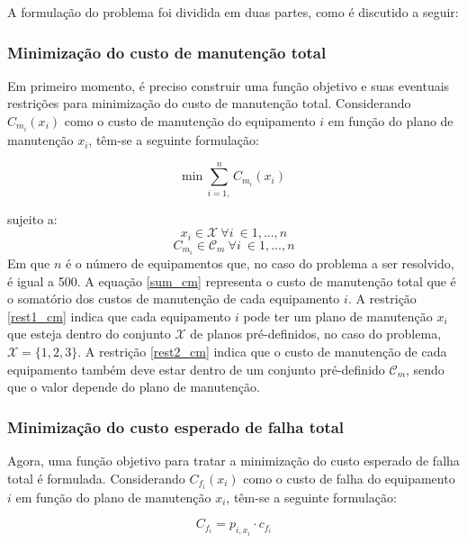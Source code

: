 A formulação do problema foi dividida em duas partes, como é discutido a seguir:

\subsubsection{Minimização do custo de manutenção total} Em primeiro
momento, é preciso construir uma função objetivo e suas eventuais restrições para minimização do custo de manutenção total. Considerando $C_{m_i}(x_i)$ como o custo de manutenção do equipamento $i$ em função do plano de manutenção $x_i$, têm-se a seguinte formulação:

\begin{equation}
\mathrm{min}\ \sum_{i=1,}^{n} C_{m_i} (x_i) 
\label{sum_cm}
\end{equation}

sujeito a:
\begin{equation}
x_i \in \mathcal{X}\ \forall i\ \in 1, ..., n
\label{rest1_cm}
\end{equation}
\begin{equation}
C_{m_i} \in \mathcal{C}_{m}\ \forall i\ \in 1, ..., n
\label{rest2_cm}
\end{equation}
Em que $n$ é o número de equipamentos que, no caso do problema a ser resolvido, é igual a 500. A equação \ref{sum_cm} representa o custo de manutenção total que é o somatório dos custos de manutenção de cada equipamento $i$. A restrição \ref{rest1_cm} indica que cada equipamento $i$ pode ter um plano de manutenção $x_i$ que esteja dentro do conjunto $\mathcal{X}$ de planos pré-definidos, no caso do problema, $\mathcal{X} = \{1,2,3\}$. A restrição \ref{rest2_cm} indica que o custo de manutenção de cada equipamento também deve estar dentro de um conjunto pré-definido $\mathcal{C}_{m}$, sendo que o valor depende do plano de manutenção.

\subsubsection{Minimização do custo esperado de falha total} Agora, uma função objetivo para tratar a minimização do custo esperado de falha total é formulada. Considerando $C_{f_i}(x_i)$ como o custo de falha do equipamento $i$ em função do plano de manutenção $x_i$, têm-se a seguinte formulação:

\begin{equation}
C_{f_i} = p_{i,x_i} \cdot c_{f_i}
\label{cf}
\end{equation}

